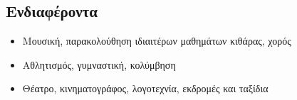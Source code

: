 \documentclass[a4paper]{article}
\begin{document}
\begin{cv}{}
\subsection*{Ενδιαφέροντα}
\begin{itemize}
  \item Μουσική, παρακολούθηση ιδιαιτέρων μαθημάτων κιθάρας,
        χορός
  \item Αθλητισμός, γυμναστική, κολύμβηση
  \item Θέατρο, κινηματογράφος, λογοτεχνία, εκδρομές και
        ταξίδια
\end{itemize}

\date{}

\end{cv}
\end{document}
